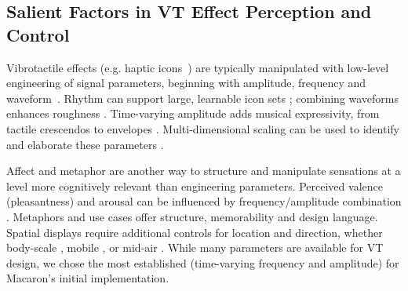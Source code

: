 \subsection{Salient Factors in VT Effect Perception and Control}
Vibrotactile effects (e.g. haptic icons~\cite{MacLean2003}) are typically manipulated with low-level engineering of signal parameters, beginning with  amplitude, frequency and waveform~\cite{Gunther2002,MacLean2003,Brewster2004,maclean2008foundations}.
%
Rhythm can support large, learnable icon sets \cite{Ternes2008,Swerdfeger2009a};  combining waveforms enhances roughness \cite{GunhyukPark2011}.
Time-varying amplitude adds musical expressivity, from tactile crescendos \cite{Brown2006} to 
envelopes \cite{Schneider2014}.
Multi-dimensional scaling %
can be used to identify %
and elaborate these parameters \cite{MacLean2003,VanErp2003,Enriquez2006,Hollins2000}.

Affect and metaphor are another way to structure and manipulate sensations at a level more cognitively relevant than engineering parameters.
Perceived valence (pleasantness) and arousal can be influenced by  frequency/amplitude combination \cite{YongjaeYoo2015,Obrist2015}.
Metaphors \cite{Chan2008,Obrist2013,Seifi2015} and use cases \cite{Chan2008,Seifi2015} offer structure, memorability and design language.
Spatial displays require additional controls for location and direction, %
whether body-scale \cite{Gunther2002,Israr2011a}, mobile  \cite{Seo2013}, or mid-air \cite{Obrist2015}.
While many parameters are available for VT design, we chose the most established (time-varying frequency and amplitude) for Macaron's initial implementation.

